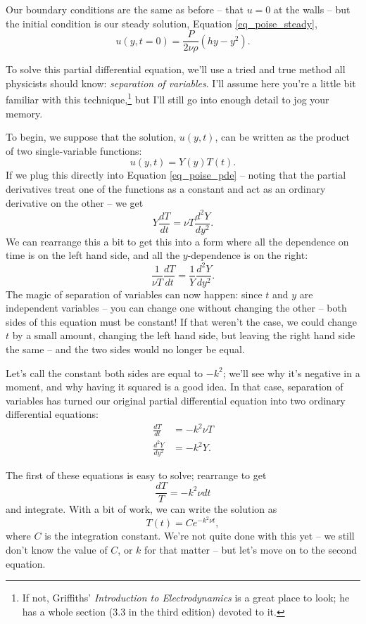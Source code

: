 Our boundary conditions are the same as before -- that $u = 0$ at the walls -- but the initial condition is our steady solution, Equation \ref{eq_poise_steady},
\begin{equation}
\label{eq_poise_ic}
u(y, t=0) = \frac{P}{2\nu \rho} (hy - y^2).
\end{equation}

To solve this partial differential equation, we'll use a tried and true method all physicists should know:  \emph{separation of variables}.  I'll assume here you're a little bit familiar with this technique,\footnote{If not, Griffiths' \emph{Introduction to Electrodynamics} is a great place to look; he has a whole section (3.3 in the third edition) devoted to it.} but I'll still go into enough detail to jog your memory.

To begin, we suppose that the solution, $u(y, t)$, can be written as the product of two single-variable functions:
\begin{equation}
u(y, t) = Y(y) T(t).
\end{equation}
If we plug this directly into Equation \ref{eq_poise_pde} -- noting that the partial derivatives treat one of the functions as a constant and act as an ordinary derivative on the other -- we get
\[
Y \frac{dT}{dt} = \nu T \frac{d^2Y}{dy^2}.
\]
We can rearrange this a bit to get this into a form where all the dependence on time is on the left hand side, and all the $y$-dependence is on the right:
\[
\frac{1}{\nu T} \frac{dT}{dt} = \frac{1}{Y} \frac{d^2Y}{dy^2}.
\]
The magic of separation of variables can now happen:  since $t$ and $y$ are independent variables -- you can change one without changing the other -- both sides of this equation must be constant!  If that weren't the case, we could change $t$ by a small amount, changing the left hand side, but leaving the right hand side the same -- and the two sides would no longer be equal.

Let's call the constant both sides are equal to $-k^2$; we'll see why it's negative in a moment, and why having it squared is a good idea.  In that case, separation of variables has turned our original partial differential equation into two ordinary differential equations:
\begin{align}
\frac{dT}{dt} & = -k^2 \nu T \\
\label{eq_poise_sho} 
\frac{d^2Y}{dy^2} & = -k^2 Y.
\end{align}

The first of these equations is easy to solve; rearrange to get
\[
\frac{dT}{T} = -k^2 \nu dt
\]
and integrate.  With a bit of work, we can write the solution as
\begin{equation}
T(t) = C e^{-k^2 \nu t},
\end{equation}
where $C$ is the integration constant.  We're not quite done with this yet -- we still don't know the value of $C$, or $k$ for that matter -- but let's move on to the second equation.  


